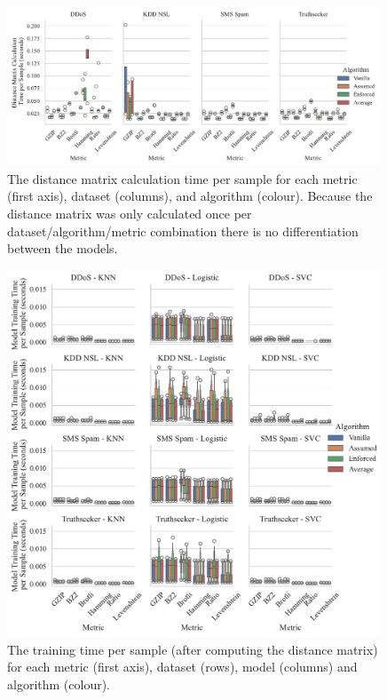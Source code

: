 \documentclass[preprint,12pt]{article}
\begin{document}
\begin{figure}[H]
    \centering
    \includegraphics[width=0.99\textwidth]{images/distance_matrix_time_vs_algorithm.pdf}
    \caption{The distance matrix calculation time per sample for each metric (first axis), dataset (columns), and algorithm (colour). Because the distance matrix was only calculated once per dataset/algorithm/metric combination there is no differentiation between the models.}
    \label{fig:distance_time}
\end{figure}

\begin{figure}[H]
    \centering
    \includegraphics[width=0.99\textwidth]{images/train_time_vs_algorithm.pdf}
    \caption{The training time  per sample (after computing the distance matrix) for each metric (first axis), dataset (rows), model (columns) and algorithm (colour).}
    \label{fig:train_time}
\end{figure}
\end{document}
